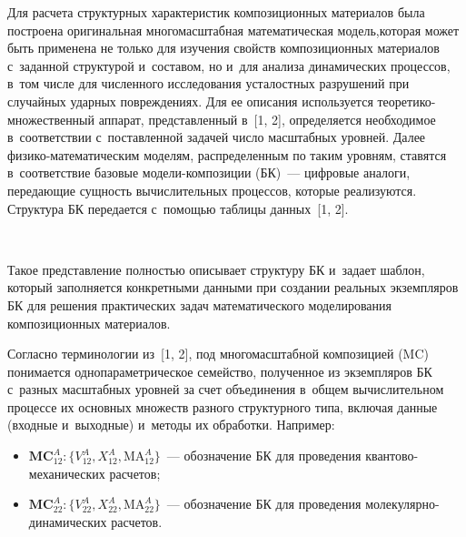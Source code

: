 \begin{multicols}{2}
     Для расчета структурных характеристик композиционных материалов была 
построена оригинальная многомасштабная математическая модель,\linebreak которая 
может быть применена не только для изуче\-ния свойств композиционных 
материалов с~заданной структурой и~составом, но и~для анализа динамических 
процессов, в~том чис\-ле для \mbox{численного} исследования усталостных разрушений 
при случайных ударных по\-вреж\-де\-ни\-ях. Для ее описания используется  
тео\-ре\-ти\-ко-мно\-жест\-вен\-ный аппарат, пред\-став\-лен\-ный в~[1, 2], 
определяется необходимое в~соответствии с~поставленной задачей число 
масштабных уровней. Далее фи\-зи\-ко-ма\-те\-ма\-ти\-че\-ским моделям, 
распределенным по таким уровням, ставятся в~соответствие базовые  
мо\-де\-ли-ком\-по\-зи\-ции (БК)~--- цифровые аналоги, пе\-ре\-да\-ющие сущ\-ность 
вычислительных процессов, которые реализуются. Структура БК передается 
с~помощью таблицы данных~[1, 2]. 

      \begin{figure*}[b] %
      \vspace*{12pt}
  \begin{center}  
    \mbox{%
\epsfxsize=126.825mm
}

\end{center}
\vspace*{-6pt}
      \end{figure*}
      
     
     Такое пред\-став\-ле\-ние пол\-ностью описывает структуру БК 
     и~задает шаб\-лон, который заполняется конкретными данными при 
создании реальных экземпляров БК для решения практических задач 
математического моделирования композиционных материалов.
{

}     

     Согласно терминологии из~[1, 2], под многомасштабной композицией (MC) 
понимается однопараметрическое семейство, полученное из эк\-зем\-п\-ля\-ров БК 
с~разных масштабных уровней за счет объединения в~общем вы\-чис\-ли\-тель\-ном 
процессе их основных множеств разного структурного типа, включая данные 
(входные и~выходные) и~методы их обработки. Например: 
\begin{itemize}
\item
$\mathbf{MC}_{12}^A: 
\{ V_{12}^A, X_{12}^A, \mathrm{MA}_{12}^A\}$~--- обозначение БК для проведения 
кван\-то\-во-ме\-ха\-ни\-че\-ских расчетов;  
\item
$\mathbf{MC}_{22}^A: \{ V_{22}^A, 
X_{22}^A, \mathrm{MA}_{22}^A\}$~--- обо\-зна\-че\-ние БК для проведения  
мо\-ле\-ку\-ляр\-но-ди\-на\-ми\-че\-ских расчетов.
\end{itemize}
     

\end{multicols}
